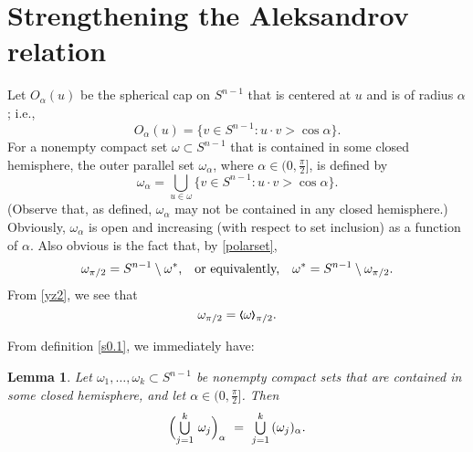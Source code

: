 \documentclass{cpamart1}     %
\newtheorem{lemm}[theo]{Lemma}
\theoremstyle{definition}
\theoremstyle{remark}
\newcommand*{\medcup}{\mathsmaller{\bigcup}}%
\newcommand{\sn}{S^{n-1}}
\newcommand{\bla}{\raise.2ex\hbox{$\scriptstyle\pmb \langle$}}
\newcommand{\bra}{\raise.2ex\hbox{$\scriptstyle\pmb \rangle$}}
\begin{document}
\section{Strengthening the Aleksandrov relation}



Let $O_\alpha(u)$ be the spherical cap on $\sn$ that is centered at $u$
and is of radius $\alpha$; i.e.,
\[
O_\alpha(u)= \{v\in \sn : u\cdot v > \cos\alpha \}.
\]
For a nonempty compact set $\omega\subset S^{n-1}$ that is contained in some closed hemisphere,
the outer parallel set $\omega_\alpha$, where $\alpha \in \big(0,\frac\pi 2\big]$,
is defined by
\begin{equation}\label{s0.1}
\omega_\alpha =
\bigcup_{u\in \omega} \{v\in \sn : u\cdot v > \cos\alpha \}.
\end{equation}
(Observe that, as defined, $\omega_\alpha$ may not be contained in any closed hemisphere.)
Obviously, $\omega_\alpha$ is open and increasing (with respect to set inclusion) as a function of $\alpha$.
 Also obvious is the fact that,
by \eqref{polarset},
\begin{equation}\label{s3.2}
\text{$\omega_{\pi/2} = \sn \setminus \omega^*$,\quad or equivalently,\quad
$\omega^*= \sn \setminus \omega_{\pi/2}$.}
\end{equation}
From \eqref{yz2}, we see that
\begin{equation}
\label{yz3}
\omega_{\pi/2}=\bla \omega\bra_{\pi/2}.
\end{equation}





From definition \eqref{s0.1}, we immediately have:

\begin{lemm}\label{s0}
Let $\omega_1, \ldots, \omega_k\subset \sn$ be nonempty compact sets that are contained in some closed hemisphere, and
let $\alpha \in \big(0,\frac\pi2\big]$. Then
\[
\Big(\medcup\limits_{j=1}^k \,\, \omega_j\Big)_\alpha\
=\  \medcup\limits_{j=1}^k \,(\omega_j)_\alpha.
\]
\end{lemm}
\end{document}

